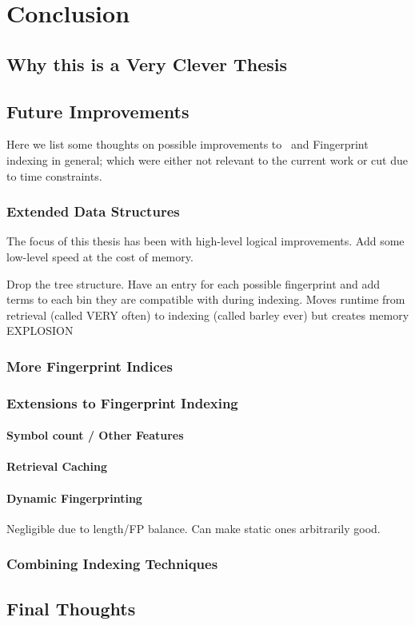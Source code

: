 
\chapter{Conclusion}
\label{cha:conclusion}

\section{Why this is a Very Clever Thesis}
\label{sec:why}

\section{Future Improvements}
\label{sec:future}

Here we list some thoughts on possible improvements to \beagle\ and Fingerprint
indexing in general; which were either not relevant to the current work or
cut due to time constraints.

\subsection{Extended Data Structures}
The focus of this thesis has been with high-level logical improvements.
Add some low-level speed at the cost of memory.

Drop the tree structure. Have an entry for each possible fingerprint and add terms
to each bin they are compatible with during indexing. Moves runtime from
retrieval (called VERY often) to indexing (called barley ever) but creates memory
EXPLOSION

\subsection{More Fingerprint Indices}

\subsection{Extensions to Fingerprint Indexing}

\subsubsection{Symbol count / Other Features}
\subsubsection{Retrieval Caching}
\subsubsection{Dynamic Fingerprinting}
Negligible due to length/FP balance. Can make static ones arbitrarily good.

\subsection{Combining Indexing Techniques}

\section{Final Thoughts}

